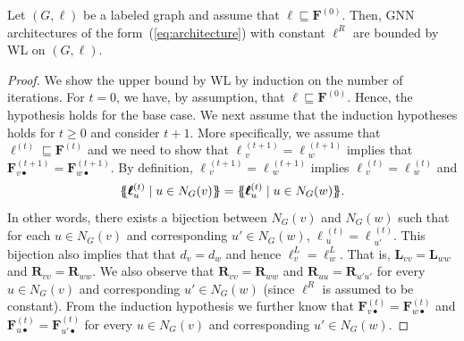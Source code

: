 \begin{proposition}\label{prop:boundconstantR}
Let $(G,\pmb{\ell})$ be a labeled graph and assume that $\pmb{\ell}\sqsubseteq\mathbf{F}^{(0)}$.
Then, GNN architectures of the form~(\ref{eq:architecture}) with constant $\pmb{\ell}^R$ are bounded by WL on $(G,\pmb{\ell})$.
\end{proposition}
\begin{proof}
We show the upper bound by WL by induction on the number of iterations. For $t=0$, we have, by assumption, that 
$\pmb{\ell}\sqsubseteq \mathbf{F}^{(0)}$. Hence, the hypothesis holds for the base case.
%
 We next assume that the induction hypotheses holds for $t\geq 0$ and consider $t+1$. More specifically, we assume that 
 $\pmb{\ell}^{(t)}\sqsubseteq \mathbf{F}^{(t)}$ and
we need to show that 
$\pmb{\ell}{}^{(t+1)}_v=\pmb{\ell}{}^{(t+1)}_w$ implies that $\mathbf{F}^{(t+1)}_{v\bullet}=\mathbf{F}^{(t+1)}_{w\bullet}$. By definition,
$\pmb{\ell}{}^{(t+1)}_v=\pmb{\ell}{}^{(t+1)}_w$ implies
$\pmb{\ell}{}^{(t)}_v=\pmb{\ell}{}^{(t)}_w$ and 
$$
\ldbl \pmb{\ell}{}^{(t)}_u \st u \in N_G(v) \rdbl=
 \ldbl \pmb{\ell}{}^{(t)}_u \st u \in N_G(w) \rdbl.$$
 In other words, there exists a bijection between $N_G(v)$ and $N_G(w)$ such that for each $u\in N_G(v)$ and corresponding $u'\in N_G(w)$, $\pmb{\ell}{}^{(t)}_u=\pmb{\ell}{}^{(t)}_{u'}$. This bijection also implies that
 that $d_v=d_w$ and hence $\pmb{\ell}^L_{v}=\pmb{\ell}^L_{w}$. That is,
 $\mathbf{L}_{vv}=\mathbf{L}_{ww}$ and $\mathbf{R}_{vv}=\mathbf{R}_{ww}$. We also observe that $\mathbf{R}_{vv}=\mathbf{R}_{ww}$ and $\mathbf{R}_{uu}=\mathbf{R}_{u'u'}$ for every $u\in N_G(v)$ and corresponding $u'\in N_G(w)$ (since $\pmb{\ell}^R$ is assumed to be constant). From the induction hypothesis we further know that 
 $\mathbf{F}^{(t)}_{v\bullet}=\mathbf{F}^{(t)}_{w\bullet}$ and 
 $\mathbf{F}^{(t)}_{u\bullet}=\mathbf{F}^{(t)}_{u'\bullet}$ for  every $u\in N_G(v)$ and corresponding $u'\in N_G(w)$.
%

\end{proof}
